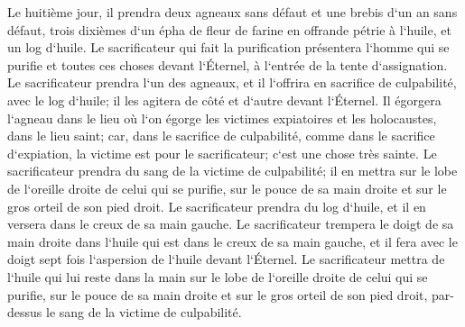 \verse Le huitième jour, il prendra deux agneaux sans défaut et une brebis d`un an sans défaut, trois dixièmes d`un épha de fleur de farine en offrande pétrie à l`huile, et un log d`huile. 
\verse Le sacrificateur qui fait la purification présentera l`homme qui se purifie et toutes ces choses devant l`Éternel, à l`entrée de la tente d`assignation. 
\verse Le sacrificateur prendra l`un des agneaux, et il l`offrira en sacrifice de culpabilité, avec le log d`huile; il les agitera de côté et d`autre devant l`Éternel. 
\verse Il égorgera l`agneau dans le lieu où l`on égorge les victimes expiatoires et les holocaustes, dans le lieu saint; car, dans le sacrifice de culpabilité, comme dans le sacrifice d`expiation, la victime est pour le sacrificateur; c`est une chose très sainte. 
\verse Le sacrificateur prendra du sang de la victime de culpabilité; il en mettra sur le lobe de l`oreille droite de celui qui se purifie, sur le pouce de sa main droite et sur le gros orteil de son pied droit. 
\verse Le sacrificateur prendra du log d`huile, et il en versera dans le creux de sa main gauche. 
\verse Le sacrificateur trempera le doigt de sa main droite dans l`huile qui est dans le creux de sa main gauche, et il fera avec le doigt sept fois l`aspersion de l`huile devant l`Éternel. 
\verse Le sacrificateur mettra de l`huile qui lui reste dans la main sur le lobe de l`oreille droite de celui qui se purifie, sur le pouce de sa main droite et sur le gros orteil de son pied droit, par-dessus le sang de la victime de culpabilité. 

